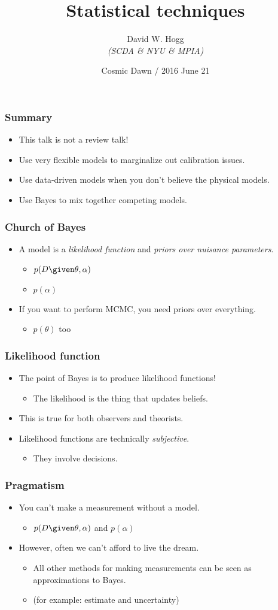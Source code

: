 \documentclass[pdftex]{beamer}
\title{Statistical techniques}
\author[David W. Hogg (NYU)]{David W. Hogg\\[1ex] {\small \textsl{(SCDA \& NYU \& MPIA)}}}
\date{Cosmic Dawn / 2016 June 21}
\newcommand{\conclusions}{%
\begin{frame}
  \frametitle{Summary}
  \begin{itemize}
  \item This talk is not a review talk!
  \item Use very flexible models to marginalize out calibration issues.
  \item Use data-driven models when you don't believe the physical models.
  \item Use Bayes to mix together competing models.
  \end{itemize}
\end{frame}}
\begin{document}
\begin{frame}
  \titlepage
\end{frame}

\conclusions

\begin{frame}
  \frametitle{Church of Bayes}
  \begin{itemize}
  \item A model is a \emph{likelihood function} and \emph{priors over nuisance parameters}.
    \begin{itemize}
    \item $p(D\given\theta,\alpha)$
    \item $p(\alpha)$
    \end{itemize}
  \item If you want to perform MCMC, you need priors over everything.
    \begin{itemize}
    \item $p(\theta)$ too
    \end{itemize}
  \end{itemize}
\end{frame}

\begin{frame}
  \frametitle{Likelihood function}
  \begin{itemize}
  \item The point of Bayes is to produce likelihood functions!
    \begin{itemize}
    \item The likelihood is the thing that updates beliefs.
    \end{itemize}
  \item This is true for both observers and theorists.
  \item Likelihood functions are technically \emph{subjective}.
    \begin{itemize}
    \item They involve decisions.
    \end{itemize}
  \end{itemize}
\end{frame}

\begin{frame}
  \frametitle{Pragmatism}
  \begin{itemize}
  \item You can't make a measurement without a model.
    \begin{itemize}
    \item $p(D\given\theta,\alpha)$ and $p(\alpha)$
    \end{itemize}
  \item However, often we can't afford to live the dream.
    \begin{itemize}
    \item All other methods for making measurements can be seen as
      approximations to Bayes.
    \item (for example: estimate and uncertainty)
    \end{itemize}
  \end{itemize}
\end{frame}
\end{document}
